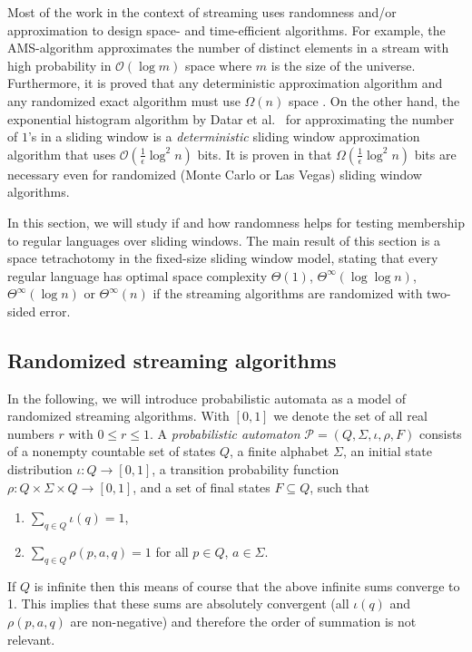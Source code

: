 \documentclass{theoretics}
\renewcommand{\O}{\mathcal{O}}
\renewcommand{\P}{\mathcal{P}}
\renewcommand{\leq}{\leqslant}
\newcommand{\Thetainf}{\Theta^{\scriptscriptstyle{\infty}}}
\begin{document}
Most of the work in the context of streaming uses randomness and/or approximation
to design space- and time-efficient algorithms.
For example, the AMS-algorithm \cite{AlonMS99} approximates the number of distinct elements
in a stream with high probability in $\O(\log m)$ space where $m$ is the size of the universe.
Furthermore, it is proved that any deterministic approximation algorithm and any randomized
exact algorithm must use $\Omega(n)$ space \cite{AlonMS99}.
On the other hand, the exponential histogram algorithm by Datar et al.~\cite{DatarGIM02} for approximating
the number of $1$'s in a sliding window is a
{\em deterministic} sliding window approximation algorithm that uses $\O(\frac{1}{\epsilon} \log^2 n)$ bits.
It is proven in \cite{DatarGIM02} that $\Omega(\frac{1}{\epsilon} \log^2 n)$ bits are necessary
even for randomized (Monte Carlo or Las Vegas) sliding window algorithms.

In this section, we will study if and how randomness helps for testing membership to regular languages
over sliding windows.
The main result of this section is a space tetrachotomy in the fixed-size sliding window model,
stating that every regular language has optimal space complexity $\Theta(1)$, $\Thetainf(\log \log n)$,
$\Thetainf(\log n)$ or $\Thetainf(n)$ if the streaming algorithms are randomized with two-sided error.

\subsection{Randomized streaming algorithms}

In the following, we will introduce probabilistic automata \cite{Paz71,Rabin63}
as a model of randomized streaming algorithms. With $[0,1]$ we denote the set of all real numbers $r$ with $0 \leq r \leq 1$.
A {\em probabilistic automaton} $\P = (Q,\Sigma,\iota,\rho,F)$
consists of a nonempty countable set of states $Q$,
a finite alphabet $\Sigma$,
an initial state distribution $\iota \colon Q \to [0,1]$,
a transition probability function $\rho \colon Q \times \Sigma \times Q \to [0,1]$,
and a set of final states $F \subseteq Q$,
such that
\begin{enumerate}[label=(\roman{*}), ref=(\roman{*})]
\item $\sum_{q \in Q} \iota(q) = 1$,
\item $\sum_{q \in Q} \rho(p,a,q) = 1$ for all $p \in Q$, $a \in \Sigma$.
\end{enumerate}
If $Q$ is infinite then this means of course that the above infinite sums converge to 1. 
This implies that these sums are absolutely convergent 
(all $\iota(q)$ and $\rho(p,a,q)$ are non-negative) and therefore the order of summation
is not relevant.
\end{document}
